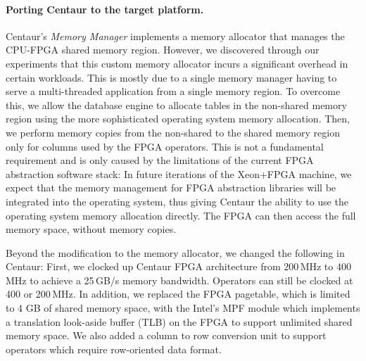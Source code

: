 \documentclass[11pt,dvipdfm]{article}
\begin{document}
\paragraph{\textbf{Porting Centaur to the target platform.}} Centaur's \emph{Memory Manager} implements a memory allocator that manages the CPU-FPGA shared memory region. However, we discovered through our experiments that this custom memory allocator incurs a significant overhead in certain workloads. This is mostly due to a single memory manager having to serve a multi-threaded application from a single memory region. To overcome this, we allow the database engine to allocate tables in the non-shared memory region using the more sophisticated operating system memory allocation. Then, we perform memory copies from the non-shared to the shared memory region only for columns used by the FPGA operators. This is not a fundamental requirement and is only caused by the limitations of the current FPGA abstraction software stack: In future iterations of the Xeon+FPGA machine, we expect that the memory management for FPGA abstraction libraries will be integrated into the operating system, thus giving Centaur the ability to use the operating system memory allocation directly. The FPGA can then access the full memory space, without memory copies.

Beyond the modification to the memory allocator, we changed the following in Centaur: First, we clocked up Centaur FPGA architecture from 200\,MHz to 400\,MHz to achieve a 25\,GB/s memory bandwidth. Operators can still be clocked at 400 or 200\,MHz. 
In addition, we replaced the FPGA pagetable, which is limited to 4 GB of shared memory space, with the Intel's MPF module which implements a translation look-aside buffer (TLB) on the FPGA to support unlimited shared memory space. We also added a column to row conversion unit to support operators which require row-oriented data format. 


\end{document}
